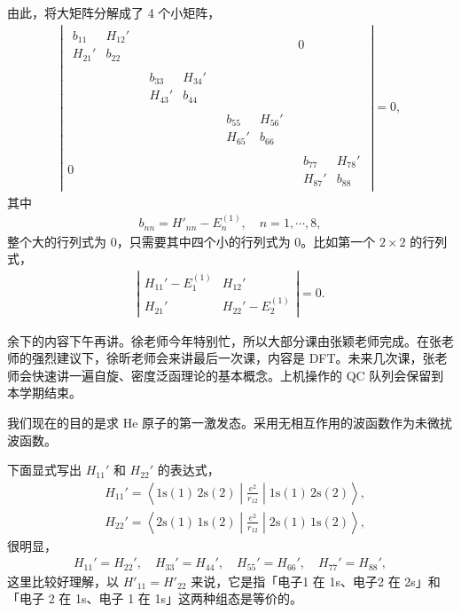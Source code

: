 由此，将大矩阵分解成了 4 个小矩阵，
\begin{align}
\left|
\begin{matrix}
\begin{matrix}
b_{11} & H_{12}' \\ H_{21}' & b_{22}
\end{matrix} & {} & {} & 0 \\
{} & \begin{matrix}
    b_{33} & H_{34}' \\ H_{43}' & b_44
\end{matrix} & {} & {} \\
{} & {} &
\begin{matrix}
    b_{55} & H_{56}' \\ H_{65}' & b_{66}
\end{matrix} & {} \\
0& {} & {} &\begin{matrix}
    b_{77} & H_{78}' \\ H_{87}' & b_{88}
\end{matrix}
\end{matrix}
\right|=0,
\end{align}
其中
\begin{align}
    b_{nn} = H'_{nn} - E_n^{(1)}, \quad n=1,\cdots,8,
\end{align}
整个大的行列式为 0，只需要其中四个小的行列式为 0。比如第一个 $2\times2$ 的行列式，
\begin{align}
    \label{eq:he_excited_2times2}
    \left|\begin{matrix}
        H_{11}'-E_1^{(1)} & H_{12}' \\
        H_{21}' & H_{22}' - E_2^{(1)}
    \end{matrix}
    \right|=0. 
\end{align}

余下的内容下午再讲。徐老师今年特别忙，所以大部分课由张颖老师完成。在张老师的强烈建议下，徐昕老师会来讲最后一次课，内容是 DFT。未来几次课，张老师会快速讲一遍自旋、密度泛函理论的基本概念。上机操作的 QC 队列会保留到本学期结束。

我们现在的目的是求 He 原子的第一激发态。采用无相互作用的波函数作为未微扰波函数。

下面显式写出 $H_{11}'$ 和 $H_{22}'$ 的表达式，
\begin{align}
&H_{11}' = \left\langle \mathrm{1s(1)\,2s(2)} \middle| \frac{e^2}{r_{12}} \middle| \mathrm{1s(1)\,2s(2)} \right\rangle, \\
&H_{22}' = \left\langle \mathrm{2s(1)\,1s(2)} \middle| \frac{e^2}{r_{12}} \middle| \mathrm{2s(1)\,1s(2)} \right\rangle, 
\end{align}
很明显，
\begin{align}
    H_{11}' = H_{22}', \quad H_{33}' = H_{44}', \quad H_{55}' = H_{66}', \quad H_{77}' = H_{88}',
\end{align}
这里比较好理解，以 $H'_{11} = H'_{22}$ 来说，它是指「电子1 在 1s、电子2 在 2s」和「电子 2 在 1s、电子 1 在 1s」这两种组态是等价的。

